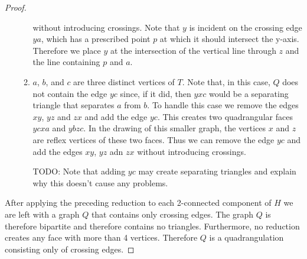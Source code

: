 \documentclass{patmorin}
\begin{document}
\begin{proof}
\begin{enumerate}
\begin{enumerate}
            without introducing crossings.  Note that $y$ is incident
            on the crossing edge $ya$, which has a prescribed point $p$
            at which it should intersect the y-axis.  Therefore we place
            $y$ at the intersection of the vertical line through $z$
            and the line containing $p$ and $a$.
          \item $a$, $b$, and $c$ are three distinct vertices of $T$.
            Note that, in this case, $Q$ does not contain the edge $yc$
            since, if it did, then $yxc$ would be a separating triangle
            that separates $a$ from $b$.  To handle this case we remove
            the edges $xy$, $yz$ and $zx$ and add the edge $yc$.
            This creates two quadrangular faces $ycxa$ and $ybzc$.
            In the drawing of this smaller graph, the vertices $x$ and
            $z$ are reflex vertices of these two faces.  Thus we can
            remove the edge $yc$ and add the edges $xy$, $yz$ adn $zx$
            without introducing crossings.

            TODO: Note that adding $yc$ may create separating triangles and explain why this doesn't cause any problems.
      \end{enumerate}
   \end{enumerate}
   After applying the preceding reduction to each 2-connected component
   of $H$ we are left with a graph $Q$ that contains only crossing
   edges.  The graph $Q$ is therefore bipartite and therefore contains
   no triangles.  Furthermore, no reduction creates any face with more
   than 4 vertices. Therefore $Q$ is a quadrangulation consisting only
   of crossing edges.  


\end{proof}
\end{document}
